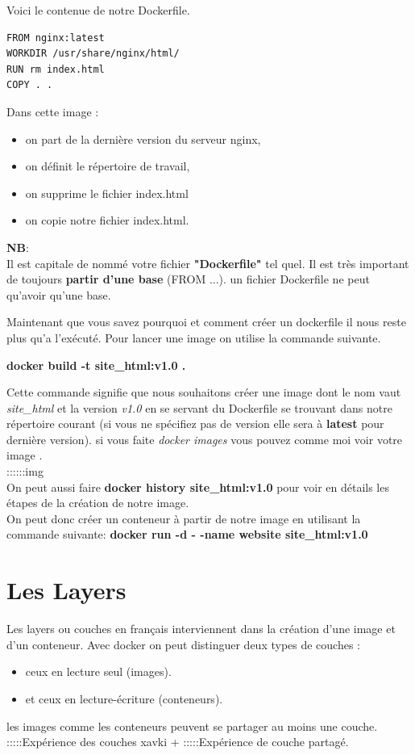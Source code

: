 \documentclass[12pt,a4paper]{article}
\begin{document}
Voici le contenue de notre Dockerfile.

\begin{verbatim}
FROM nginx:latest
WORKDIR /usr/share/nginx/html/
RUN rm index.html
COPY . .
\end{verbatim}

Dans cette image :
\begin{itemize}
\item on part de la dernière version du serveur nginx,
\item on définit le répertoire de travail,
\item on supprime le fichier index.html
\item on copie notre fichier index.html.
\end{itemize} 

\textbf{NB}: \\
Il est capitale de nommé votre fichier \textbf{"Dockerfile"} tel quel.
Il est très important de toujours \textbf{partir d'une base} (FROM ...).
un fichier Dockerfile ne peut qu'avoir qu'une base.

Maintenant que vous savez pourquoi et comment créer un dockerfile il nous reste plus
qu'a l'exécuté. Pour lancer une image on utilise la commande suivante.

\textbf{docker build -t site\_html:v1.0 .}

Cette commande signifie que nous souhaitons créer une image dont le nom vaut \textit{site\_html}
et la version \textit{v1.0} en se servant du Dockerfile se trouvant dans notre répertoire 
courant (si vous ne spécifiez pas de version elle sera à \textbf{latest} pour dernière version).
si vous faite \textit{docker images} vous pouvez comme moi voir votre image .\\
::::::img\\
On peut aussi faire \textbf{docker history site\_html:v1.0} pour voir en détails les étapes de 
la création de notre image.\\

On peut donc créer un conteneur à partir de notre image en utilisant la commande suivante:
\textbf{docker run -d - -name website site\_html:v1.0}

\section{Les Layers}
Les layers ou couches en français interviennent dans la création d'une image et d'un conteneur. Avec docker on peut distinguer deux types de couches :
\begin{itemize}
\item ceux en lecture seul (images).
\item et ceux en lecture-écriture (conteneurs).
\end{itemize} 
les images comme les conteneurs peuvent se partager au moins une couche.
:::::Expérience des couches xavki +
:::::Expérience de couche partagé.
\end{document}
